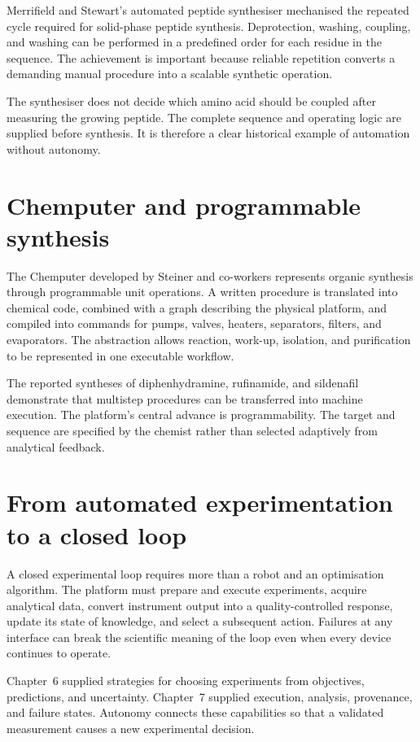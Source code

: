 Merrifield and Stewart's automated peptide synthesiser mechanised the repeated cycle required for solid-phase peptide synthesis.
Deprotection, washing, coupling, and washing can be performed in a predefined order for each residue in the sequence.
The achievement is important because reliable repetition converts a demanding manual procedure into a scalable synthetic operation.

The synthesiser does not decide which amino acid should be coupled after measuring the growing peptide.
The complete sequence and operating logic are supplied before synthesis.
It is therefore a clear historical example of automation without autonomy.

\section{Chemputer and programmable synthesis}

The Chemputer developed by Steiner and co-workers represents organic synthesis through programmable unit operations.
A written procedure is translated into chemical code, combined with a graph describing the physical platform, and compiled into commands for pumps, valves, heaters, separators, filters, and evaporators.
The abstraction allows reaction, work-up, isolation, and purification to be represented in one executable workflow.

The reported syntheses of diphenhydramine, rufinamide, and sildenafil demonstrate that multistep procedures can be transferred into machine execution.
The platform's central advance is programmability.
The target and sequence are specified by the chemist rather than selected adaptively from analytical feedback.

\section{From automated experimentation to a closed loop}

A closed experimental loop requires more than a robot and an optimisation algorithm.
The platform must prepare and execute experiments, acquire analytical data, convert instrument output into a quality-controlled response, update its state of knowledge, and select a subsequent action.
Failures at any interface can break the scientific meaning of the loop even when every device continues to operate.

Chapter~6 supplied strategies for choosing experiments from objectives, predictions, and uncertainty.
Chapter~7 supplied execution, analysis, provenance, and failure states.
Autonomy connects these capabilities so that a validated measurement causes a new experimental decision.

